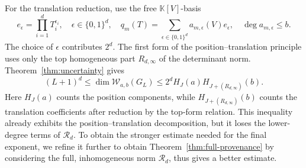 \documentclass[11pt,reqno]{amsart}
\newcommand\K{\ensuremath{\mathbb{K}}}
\theoremstyle{definition}
\theoremstyle{plain}
\numberwithin{equation}{section}
\begin{document}
For the translation reduction, use the free $\K[V]$-basis
\begin{equation*}
    e_\epsilon=\prod_{i=1}^dT_i^{\epsilon_i},
    \quad
    \epsilon\in\{0,1\}^d,
    \quad
    q_m(T)=\sum_{\epsilon\in\{0,1\}^d}
    a_{m,\epsilon}(V)e_\epsilon,
    \quad
    \deg a_{m,\epsilon}\leq b.
\end{equation*}
The choice of $\epsilon$ contributes $2^d$.
The first form of the position--translation principle uses only the top homogeneous part $R_{d,\infty}$ of the determinant norm. Theorem~\ref{thm:uncertainty} gives
\begin{equation*}
    (L+1)^d
    \leq
    \dim\mathcal W_{a,b}(G_L)
    \leq
    2^dH_J(a)H_{J+(R_{d,\infty})}(b).
\end{equation*}
Here $H_J(a)$ counts the position components, while
$H_{J+(R_{d,\infty})}(b)$ counts the translation coefficients after
reduction by the top-form relation. This inequality already exhibits
the position--translation decomposition, but it loses the lower-degree
terms of $\mathcal R_d$. To obtain the stronger estimate needed for the
final exponent, we refine it further to obtain Theorem~\ref{thm:full-provenance} by considering the full,
inhomogeneous norm $\mathcal R_d$, thus gives a better estimate.
\end{document}

